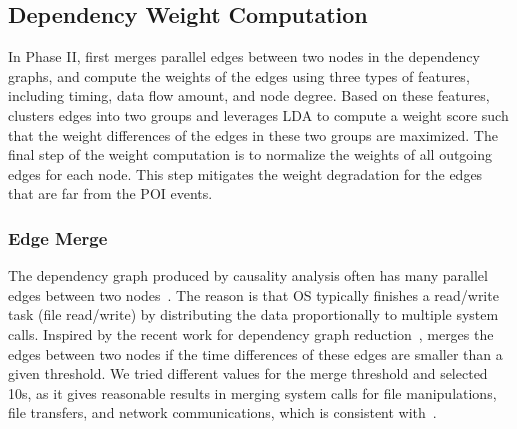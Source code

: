 
\subsection{Dependency Weight Computation}
\label{subsec:phase2}

In Phase II, \tool first merges parallel edges between two nodes in the dependency graphs, and compute the weights of the edges using three types of features, including timing, data flow amount, and node degree.
Based on these features, \tool clusters edges into two groups and leverages LDA to compute a weight score such that the weight differences of the edges in these two groups are maximized.
The final step of the weight computation is to normalize the weights of all outgoing edges for each node. 
This step mitigates the weight degradation for the edges that are far from the POI events. 



\subsubsection{Edge Merge}
\label{subsubsec:edge-merge}

The dependency graph produced by causality analysis often has many parallel edges between two nodes~\cite{reduction}.
The reason is that OS typically finishes a read/write task (\eg file read/write) by distributing the data proportionally to multiple system calls.
Inspired by the recent work for dependency graph reduction~\cite{reduction}, \tool merges the edges between two nodes if the time differences of these edges are smaller than a given threshold. 
We tried different values for the merge threshold and selected 10s, as it gives reasonable results in merging system calls for file manipulations, file transfers, and network communications, which is consistent with~\cite{reduction}.



